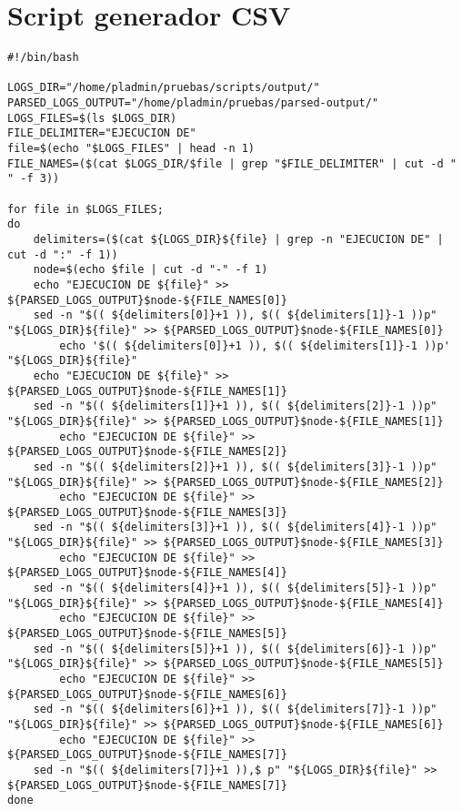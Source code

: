 \section{Script generador CSV}
\label{Apendice2:XXX}

\begin{center}
\begin{footnotesize}
\begin{verbatim}
#!/bin/bash

LOGS_DIR="/home/pladmin/pruebas/scripts/output/"
PARSED_LOGS_OUTPUT="/home/pladmin/pruebas/parsed-output/"
LOGS_FILES=$(ls $LOGS_DIR)
FILE_DELIMITER="EJECUCION DE"
file=$(echo "$LOGS_FILES" | head -n 1)
FILE_NAMES=($(cat $LOGS_DIR/$file | grep "$FILE_DELIMITER" | cut -d " " -f 3))

for file in $LOGS_FILES;
do
	delimiters=($(cat ${LOGS_DIR}${file} | grep -n "EJECUCION DE" | cut -d ":" -f 1))
	node=$(echo $file | cut -d "-" -f 1)
	echo "EJECUCION DE ${file}" >> ${PARSED_LOGS_OUTPUT}$node-${FILE_NAMES[0]}
 	sed -n "$(( ${delimiters[0]}+1 )), $(( ${delimiters[1]}-1 ))p" "${LOGS_DIR}${file}" >> ${PARSED_LOGS_OUTPUT}$node-${FILE_NAMES[0]}
        echo '$(( ${delimiters[0]}+1 )), $(( ${delimiters[1]}-1 ))p' "${LOGS_DIR}${file}"
	echo "EJECUCION DE ${file}" >> ${PARSED_LOGS_OUTPUT}$node-${FILE_NAMES[1]}
	sed -n "$(( ${delimiters[1]}+1 )), $(( ${delimiters[2]}-1 ))p" "${LOGS_DIR}${file}" >> ${PARSED_LOGS_OUTPUT}$node-${FILE_NAMES[1]}
        echo "EJECUCION DE ${file}" >> ${PARSED_LOGS_OUTPUT}$node-${FILE_NAMES[2]}
	sed -n "$(( ${delimiters[2]}+1 )), $(( ${delimiters[3]}-1 ))p" "${LOGS_DIR}${file}" >> ${PARSED_LOGS_OUTPUT}$node-${FILE_NAMES[2]}
        echo "EJECUCION DE ${file}" >> ${PARSED_LOGS_OUTPUT}$node-${FILE_NAMES[3]}
	sed -n "$(( ${delimiters[3]}+1 )), $(( ${delimiters[4]}-1 ))p" "${LOGS_DIR}${file}" >> ${PARSED_LOGS_OUTPUT}$node-${FILE_NAMES[3]}
        echo "EJECUCION DE ${file}" >> ${PARSED_LOGS_OUTPUT}$node-${FILE_NAMES[4]}
	sed -n "$(( ${delimiters[4]}+1 )), $(( ${delimiters[5]}-1 ))p" "${LOGS_DIR}${file}" >> ${PARSED_LOGS_OUTPUT}$node-${FILE_NAMES[4]}
        echo "EJECUCION DE ${file}" >> ${PARSED_LOGS_OUTPUT}$node-${FILE_NAMES[5]}
	sed -n "$(( ${delimiters[5]}+1 )), $(( ${delimiters[6]}-1 ))p" "${LOGS_DIR}${file}" >> ${PARSED_LOGS_OUTPUT}$node-${FILE_NAMES[5]}
        echo "EJECUCION DE ${file}" >> ${PARSED_LOGS_OUTPUT}$node-${FILE_NAMES[6]}
	sed -n "$(( ${delimiters[6]}+1 )), $(( ${delimiters[7]}-1 ))p" "${LOGS_DIR}${file}" >> ${PARSED_LOGS_OUTPUT}$node-${FILE_NAMES[6]}
        echo "EJECUCION DE ${file}" >> ${PARSED_LOGS_OUTPUT}$node-${FILE_NAMES[7]}
	sed -n "$(( ${delimiters[7]}+1 )),$ p" "${LOGS_DIR}${file}" >> ${PARSED_LOGS_OUTPUT}$node-${FILE_NAMES[7]}
done
\end{verbatim}
\end{footnotesize}
\end{center}\vspace{4mm}